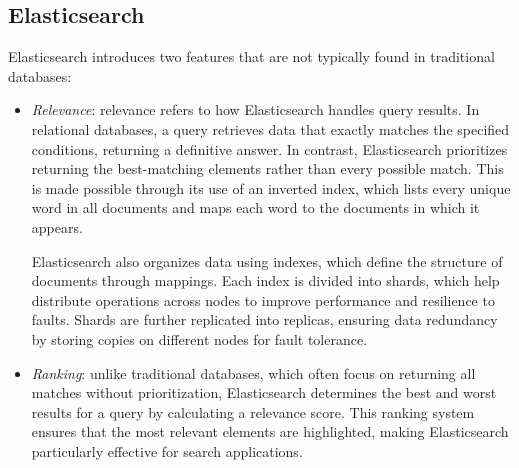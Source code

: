 \subsection{Elasticsearch}
Elasticsearch introduces two features that are not typically found in traditional databases: 
\begin{itemize}
    \item \textit{Relevance}: relevance refers to how Elasticsearch handles query results. 
    In relational databases, a query retrieves data that exactly matches the specified conditions, returning a definitive answer. 
    In contrast, Elasticsearch prioritizes returning the best-matching elements rather than every possible match. 
    This is made possible through its use of an inverted index, which lists every unique word in all documents and maps each word to the documents in which it appears.

    Elasticsearch also organizes data using indexes, which define the structure of documents through mappings. 
    Each index is divided into shards, which help distribute operations across nodes to improve performance and resilience to faults. 
    Shards are further replicated into replicas, ensuring data redundancy by storing copies on different nodes for fault tolerance.
    \item \textit{Ranking}: unlike traditional databases, which often focus on returning all matches without prioritization, Elasticsearch determines the best and worst results for a query by calculating a relevance score. 
        This ranking system ensures that the most relevant elements are highlighted, making Elasticsearch particularly effective for search applications.


\end{itemize}
